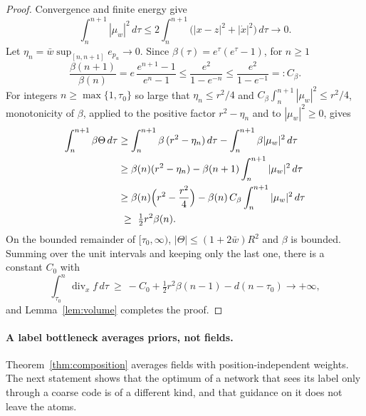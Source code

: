 \documentclass{article} %
\newcommand{\iclrbr}{\\&}\newcommand{\iclrbrq}{\\&\qquad}\newcommand{\iclrqbr}{\\&}
\newcommand{\iclrbr}{}\newcommand{\iclrbrq}{}\newcommand{\iclrqbr}{\qquad}
\theoremstyle{plain}
\theoremstyle{definition}
\theoremstyle{remark}
\begin{document}
\begin{proof}
Convergence and finite energy give
\[
\int_n^{n+1}|\mu_w|^2\,d\tau\le2\int_n^{n+1}\bigl(|x-z|^2+|\dot x|^2\bigr)\,d\tau\longrightarrow0 .
\]
Let $\eta_n=\bar w\sup_{[n,n+1]}e_{p_u}\to0$. Since $\beta(\tau)=e^\tau(e^\tau-1)$, for $n\ge1$
\[
\frac{\beta(n+1)}{\beta(n)}=e\,\frac{e^{n+1}-1}{e^n-1}\le\frac{e^2}{1-e^{-n}}\le\frac{e^2}{1-e^{-1}}=:C_\beta .
\]
For integers $n\ge\max\{1,\tau_0\}$ so large that $\eta_n\le r^2/4$ and
$C_\beta\int_n^{n+1}|\mu_w|^2\le r^2/4$, monotonicity of $\beta$, applied to the positive factor
$r^2-\eta_n$ and to $|\mu_w|^2\ge0$, gives
\begin{align*}
\int_n^{n+1}\beta\Theta\,d\tau
&\ge\int_n^{n+1}\beta\,(r^2-\eta_n)\,d\tau-\int_n^{n+1}\beta|\mu_w|^2\,d\tau
\iclrbr\ge\beta(n)(r^2-\eta_n)-\beta(n+1)\int_n^{n+1}|\mu_w|^2\,d\tau\\
&\ge\beta(n)\Bigl(r^2-\frac{r^2}4\Bigr)-\beta(n)\,C_\beta\int_n^{n+1}|\mu_w|^2\,d\tau
\iclrbr\ \ge\ \tfrac12r^2\beta(n).
\end{align*}
On the bounded remainder of $[\tau_0,\infty)$, $|\Theta|\le(1+2\bar w)R^2$ and $\beta$ is bounded.
Summing over the unit intervals and keeping only the last one, there is a constant $C_0$ with
\[
\int_{\tau_0}^n\operatorname{div}_xf\,d\tau\ \ge\ -C_0+\tfrac12r^2\beta(n-1)-d(n-\tau_0)
\longrightarrow+\infty ,
\]
and Lemma~\ref{lem:volume} completes the proof.
\end{proof}

\label{apx:pf-bottleneck}
\paragraph{A label bottleneck averages priors, not fields.} Theorem~\ref{thm:composition} averages
fields with position-independent weights. The next statement shows that the optimum of a network
that sees its label only through a coarse code is of a different kind, and that guidance on it
does not leave the atoms.
\end{document}
